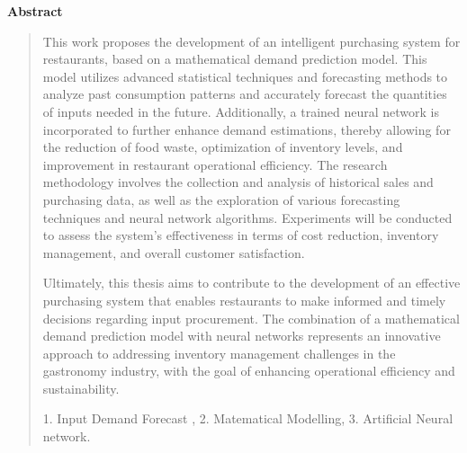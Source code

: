 \thispagestyle{empty}
\begin{center}
\begin{LARGE}
\textbf{Abstract}
\end{LARGE}
\end{center}

\begin{quotation}
    This work proposes the development of an intelligent purchasing system for restaurants, based on a mathematical demand prediction model. This model utilizes advanced statistical techniques and forecasting methods to analyze past consumption patterns and accurately forecast the quantities of inputs needed in the future. Additionally, a trained neural network is incorporated to further enhance demand estimations, thereby allowing for the reduction of food waste, optimization of inventory levels, and improvement in restaurant operational efficiency. The research methodology involves the collection and analysis of historical sales and purchasing data, as well as the exploration of various forecasting techniques and neural network algorithms. Experiments will be conducted to assess the system's effectiveness in terms of cost reduction, inventory management, and overall customer satisfaction.

    Ultimately, this thesis aims to contribute to the development of an effective purchasing system that enables restaurants to make informed and timely decisions regarding input procurement. The combination of a mathematical demand prediction model with neural networks represents an innovative approach to addressing inventory management challenges in the gastronomy industry, with the goal of enhancing operational efficiency and sustainability.
    
    
\vspace*{0.5cm}

 1. Input Demand Forecast
, 2. Matematical Modelling, 3. Artificial Neural network.

\end{quotation}
